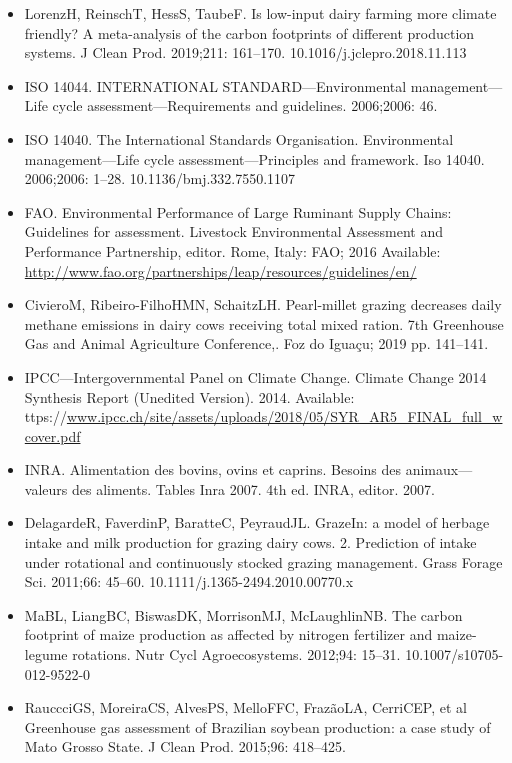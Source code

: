\documentclass[11pt,a4paper]{article}
\begin{document}
\begin{itemize}
\item LorenzH, ReinschT, HessS, TaubeF. Is low-input dairy farming more climate friendly? A meta-analysis of the carbon footprints of different production systems. J Clean Prod. 2019;211: 161–170. 10.1016/j.jclepro.2018.11.113
\item ISO 14044. INTERNATIONAL STANDARD—Environmental management—Life cycle assessment—Requirements and guidelines. 2006;2006: 46.
\item ISO 14040. The International Standards Organisation. Environmental management—Life cycle assessment—Principles and framework. Iso 14040. 2006;2006: 1–28. 10.1136/bmj.332.7550.1107
\item FAO. Environmental Performance of Large Ruminant Supply Chains: Guidelines for assessment. Livestock Environmental Assessment and Performance Partnership, editor. Rome, Italy: FAO; 2016 Available: \href{http://www.fao.org/partnerships/leap/resources/guidelines/en/}{http://www.fao.org/partnerships/leap/resources/guidelines/en/}
\item CivieroM, Ribeiro-FilhoHMN, SchaitzLH. Pearl-millet grazing decreases daily methane emissions in dairy cows receiving total mixed ration. 7th Greenhouse Gas and Animal Agriculture Conference,. Foz do Iguaçu; 2019 pp. 141–141.
\item IPCC—Intergovernmental Panel on Climate Change. Climate Change 2014 Synthesis Report (Unedited Version). 2014. Available: ttps://\href{http://www.ipcc.ch/site/assets/uploads/2018/05/SYR\_AR5\_FINAL\_full\_wcover.pdf}{www.ipcc.ch/site/assets/uploads/2018/05/SYR\_AR5\_FINAL\_full\_wcover.pdf}
\item INRA. Alimentation des bovins, ovins et caprins. Besoins des animaux—valeurs des aliments. Tables Inra 2007. 4th ed. INRA, editor. 2007.
\item DelagardeR, FaverdinP, BaratteC, PeyraudJL. GrazeIn: a model of herbage intake and milk production for grazing dairy cows. 2. Prediction of intake under rotational and continuously stocked grazing management. Grass Forage Sci. 2011;66: 45–60. 10.1111/j.1365-2494.2010.00770.x
\item MaBL, LiangBC, BiswasDK, MorrisonMJ, McLaughlinNB. The carbon footprint of maize production as affected by nitrogen fertilizer and maize-legume rotations. Nutr Cycl Agroecosystems. 2012;94: 15–31. 10.1007/s10705-012-9522-0
\item RauccciGS, MoreiraCS, AlvesPS, MelloFFC, FrazãoLA, CerriCEP, et al Greenhouse gas assessment of Brazilian soybean production: a case study of Mato Grosso State. J Clean Prod. 2015;96: 418–425.

\end{itemize}
\end{document}
